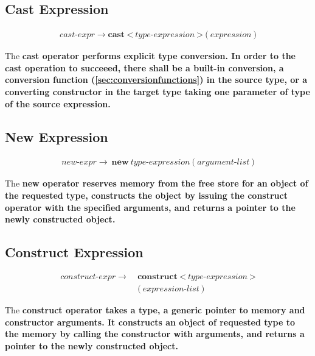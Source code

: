\documentclass[a4paper,oneside,11pt]{article}
\begin{document}
\subsection{Cast Expression}\label{cast}

\begin{align*}
cast\textrm{-}expr \rightarrow \textbf{cast} \> \texttt{<} \> \hyperref[typeexpr]{type\textrm{-}expression} \> \texttt{>} \> \texttt{(} \>
\hyperref[expression]{expression} \> \texttt{)}
\end{align*}

The \bf{cast} operator performs explicit type conversion.
In order to the cast operation to succeeed, there shall be a built-in conversion, a conversion function (\ref{sec:conversionfunctions}) in the source type,
or a converting constructor in the target type taking one parameter of type of the source expression.

\subsection{New Expression}\label{new}

\begin{align*}
new\textrm{-}expr \rightarrow \> \textbf{new} \> \hyperref[typeexpr]{type\textrm{-}expression} \> \texttt{(} \> \hyperref[argumentlist]{argument\textrm{-}list} \> \texttt{)}
\end{align*}

The \bf{new} operator reserves memory from the free store for an object of the requested type,
constructs the object by issuing the \bf{construct} operator with the specified arguments,
and returns a pointer to the newly constructed object.

\subsection{Construct Expression}\label{construct}

\begin{align*}
construct\textrm{-}expr \rightarrow \> &\textbf{construct} \> \texttt{<} \> \hyperref[typeexpr]{type\textrm{-}expression} \> \texttt{>}\\
&\texttt{(} \> \hyperref[expressionlist]{expression\textrm{-}list} \> \texttt{)}
\end{align*}

The \bf{construct} operator takes a type, a generic pointer to memory and constructor arguments.
It constructs an object of requested type to the memory by calling the constructor with arguments,
and returns a pointer to the newly constructed object.
\end{document}
